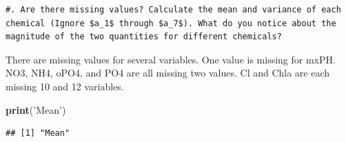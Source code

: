 \documentclass[]{article}
\newenvironment{Shaded}{\begin{snugshade}}{\end{snugshade}}
\newcommand{\KeywordTok}[1]{\textcolor[rgb]{0.13,0.29,0.53}{\textbf{#1}}}
\newcommand{\DataTypeTok}[1]{\textcolor[rgb]{0.13,0.29,0.53}{#1}}
\newcommand{\StringTok}[1]{\textcolor[rgb]{0.31,0.60,0.02}{#1}}
\newcommand{\ControlFlowTok}[1]{\textcolor[rgb]{0.13,0.29,0.53}{\textbf{#1}}}
\newcommand{\OperatorTok}[1]{\textcolor[rgb]{0.81,0.36,0.00}{\textbf{#1}}}
\newcommand{\NormalTok}[1]{#1}
\begin{document}
\begin{Shaded}
\end{Shaded}

\begin{verbatim}
#. Are there missing values? Calculate the mean and variance of each
chemical (Ignore $a_1$ through $a_7$). What do you notice about the
magnitude of the two quantities for different chemicals? 
\end{verbatim}

\begin{Shaded}
\end{Shaded}

There are missing values for several variables. One value is missing for
mxPH. NO3, NH4, oPO4, and PO4 are all missing two values. Cl and Chla
are each missing 10 and 12 variables.

\begin{Shaded}
\begin{Highlighting}[]
\KeywordTok{print}\NormalTok{(}\StringTok{'Mean'}\NormalTok{)}
\end{Highlighting}
\end{Shaded}

\begin{verbatim}
## [1] "Mean"
\end{verbatim}
\end{document}
